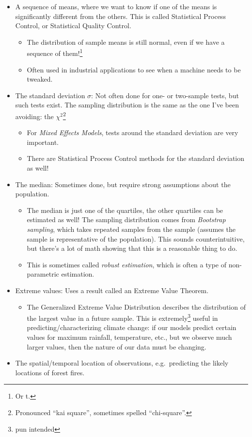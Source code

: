 \documentclass[
  letterpaper,
  DIV=11,
  numbers=noendperiod]{scrreprt}
\providecommand{\tightlist}{%
  \setlength{\itemsep}{0pt}\setlength{\parskip}{0pt}}\usepackage{longtable,booktabs,array}
\begin{document}
\begin{itemize}
\tightlist
\item
  A sequence of means, where we want to know if one of the means is
  significantly different from the others. This is called Statistical
  Process Control, or Statistical Quality Control.

  \begin{itemize}
  \tightlist
  \item
    The distribution of sample means is still normal, even if we have a
    sequence of them!\footnote{Or t.}
  \item
    Often used in industrial applications to see when a machine needs to
    be tweaked.
  \end{itemize}
\item
  The standard deviation \(\sigma\): Not often done for one- or
  two-sample tests, but such tests exist. The sampling distribution is
  the same as the one I've been avoiding: the \(\chi^2\)\footnote{Pronounced
    ``kai square'', sometimes spelled ``chi-square''.}

  \begin{itemize}
  \tightlist
  \item
    For \emph{Mixed Effects Models}, tests around the standard deviation
    are very important.
  \item
    There are Statistical Process Control methods for the standard
    deviation as well!
  \end{itemize}
\item
  The median: Sometimes done, but require strong assumptions about the
  population.

  \begin{itemize}
  \tightlist
  \item
    The median is just one of the quartiles, the other quartiles can be
    estimated as well! The sampling distribution comes from
    \emph{Bootstrap sampling}, which takes repeated samples from the
    sample (assumes the sample is representative of the population).
    This sounds counterintuitive, but there's a lot of math showing that
    this is a reasonable thing to do.
  \item
    This is sometimes called \emph{robust estimation}, which is often a
    type of non-parametric estimation.
  \end{itemize}
\item
  Extreme values: Uses a result called an Extreme Value Theorem.

  \begin{itemize}
  \tightlist
  \item
    The Generalized Extreme Value Distribution describes the
    distribution of the largest value in a future sample. This is
    extremely\footnote{pun intended} useful in predicting/characterizing
    climate change: if our models predict certain values for maximum
    rainfall, temperature, etc., but we observe much larger values, then
    the nature of our data must be changing.
  \end{itemize}
\item
  The spatial/temporal location of observations, e.g.~predicting the
  likely locations of forest fires.


\end{itemize}
\end{document}
